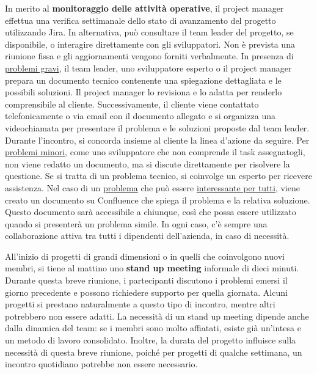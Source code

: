         In merito al \textbf{monitoraggio delle attività operative}, il project manager effettua una verifica settimanale dello stato di avanzamento del progetto utilizzando Jira.
        In alternativa, può consultare il team leader del progetto, se disponibile, o interagire direttamente con gli sviluppatori. Non è prevista una riunione fissa e gli
        aggiornamenti vengono forniti verbalmente. In presenza di \underline{problemi gravi}, il team leader, uno sviluppatore esperto o il project manager prepara un
        documento tecnico contenente una spiegazione dettagliata e le possibili soluzioni. Il project manager lo revisiona e lo adatta per renderlo comprensibile
        al cliente. Successivamente, il cliente viene contattato telefonicamente o via email con il documento allegato e si organizza una videochiamata per
        presentare il problema e le soluzioni proposte dal team leader. Durante l'incontro, si concorda insieme al cliente la linea d'azione da seguire.
        Per \underline{problemi minori}, come uno sviluppatore che non comprende il task assegnatogli, non viene redatto un documento, ma si discute direttamente per
        risolvere la questione. Se si tratta di un problema tecnico, si coinvolge un esperto per ricevere assistenza. Nel caso di un \underline{problema} che può essere 
        \underline{interessante per tutti}, viene
        creato un documento su Confluence che spiega il problema e la relativa soluzione. Questo documento sarà accessibile a chiunque, così che possa essere utilizzato quando si presenterà un problema simile.
        In ogni caso, c'è sempre una collaborazione attiva tra tutti i dipendenti dell’azienda, in caso di necessità.

        All'inizio di progetti di grandi dimensioni o in quelli che coinvolgono nuovi membri, si tiene al mattino uno \textbf{stand up meeting} informale di dieci minuti.
        Durante questa breve riunione, i partecipanti discutono i problemi emersi il giorno precedente e possono richiedere supporto per quella giornata. Alcuni
        progetti si prestano naturalmente a questo tipo di incontro, mentre altri potrebbero non essere adatti. La necessità di un stand up meeting dipende anche
        dalla dinamica del team: se i membri sono molto affiatati, esiste già un'intesa e un metodo di lavoro consolidato. Inoltre, la durata del progetto influisce
        sulla necessità di questa breve riunione, poiché per progetti di qualche settimana, un incontro quotidiano potrebbe non essere necessario.

